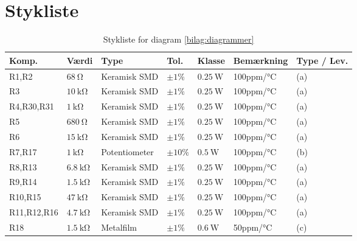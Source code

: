 \clearpage \newpage 
\section{Stykliste} \label{bilag:styklister}

\begin{table}[h!]
\tiny
\caption{Stykliste for diagram \ref{bilag:diagrammer}}
\label{tab:udstyr}
\begin{threeparttable}
\begin{tabular}{ l l l l l l l }
\toprule
\multicolumn{1}{l}{\textbf{Komp.}}       &
\multicolumn{1}{l}{\textbf{Værdi}}       &
\multicolumn{1}{l}{\textbf{Type}}       &
\multicolumn{1}{l}{\textbf{Tol.}} &
\multicolumn{1}{l}{\textbf{Klasse}} &
\multicolumn{1}{l}{\textbf{Bemærkning}} &
\multicolumn{1}{l}{\textbf{Type / Lev.}}  \\ 
\hline
R1,R2 & $\SI{68}{\ohm}$			& Keramisk	SMD	& $\pm 1\%$ 		 & $\SI{0.25}{\watt}$	  & 100ppm/\si{\celsius}  & (a) \\
R3 & $\SI{10}{\kilo\ohm}$		& Keramisk	SMD	& $\pm 1\%$ 		 & $\SI{0.25}{\watt}$	  & 100ppm/\si{\celsius}  & (a) \\
R4,R30,R31 & $\SI{1}{\kilo\ohm}$		& Keramisk	SMD	& $\pm 1\%$ 		 & $\SI{0.25}{\watt}$	  & 100ppm/\si{\celsius}  & (a) \\
R5 & $\SI{680}{\ohm}$			& Keramisk	SMD	& $\pm 1\%$ 		 & $\SI{0.25}{\watt}$	  & 100ppm/\si{\celsius}  & (a) \\
R6 & $\SI{15}{\kilo\ohm}$		& Keramisk	SMD	& $\pm 1\%$ 		 & $\SI{0.25}{\watt}$	  & 100ppm/\si{\celsius}  & (a)\\
R7,R17 & $\SI{1}{\kilo\ohm}$		& Potentiometer		& $\pm 10\%$ 		 & $\SI{0.5}{\watt}$	  & 100ppm/\si{\celsius}  & (b)  \\
R8,R13 & $\SI{6.8}{\kilo\ohm}$		& Keramisk	SMD	& $\pm 1\%$ 		 & $\SI{0.25}{\watt}$	  & 100ppm/\si{\celsius}  & (a) \\
R9,R14 & $\SI{1.5}{\kilo\ohm}$		& Keramisk	SMD	& $\pm 1\%$ 		 & $\SI{0.25}{\watt}$	  & 100ppm/\si{\celsius}  & (a) \\
R10,R15 & $\SI{47}{\kilo\ohm}$		& Keramisk	SMD	& $\pm 1\%$ 		 & $\SI{0.25}{\watt}$	  & 100ppm/\si{\celsius}  & (a) \\
R11,R12,R16 & $\SI{4.7}{\kilo\ohm}$		& Keramisk	SMD	& $\pm 1\%$ 		 & $\SI{0.25}{\watt}$	  & 100ppm/\si{\celsius}  & (a) \\
R18 & $\SI{1.5}{\kilo\ohm}$		& Metalfilm	& $\pm 1\%$ 		 & $\SI{0.6}{\watt}$	  & 50ppm/\si{\celsius}  & (c) \\

\end{tabular}
\end{threeparttable}
\end{table}
